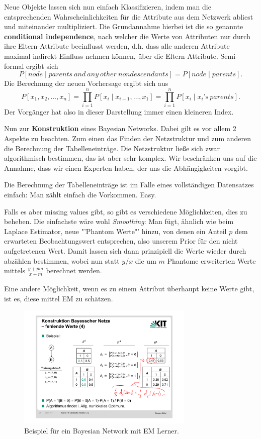 Neue Objekte lassen sich nun einfach Klassifizieren, indem man die
entsprechenden Wahrscheinlichkeiten für die Attribute aus dem Netzwerk
abliest und miteinander multipliziert. Die Grundannahme hierbei ist 
die so genannte \textbf{conditional independence}, nach welcher die
Werte von Attributen nur durch ihre Eltern-Attribute beeinflusst werden,
d.h. dass alle anderen Attribute maximal indirekt Einfluss nehmen können,
über die Eltern-Attribute. Semi-formal ergibt sich
\[
P[node \mid parents\ and\ any\ other\ nondescendants] = P[node \mid parents].
\]
Die Berechnung der neuen Vorhersage ergibt sich aus
\[
P[x_1,x_2,\dots,x_n] = \prod_{i=1}^n P[x_i \mid x_{i-1},\dots,x_1]
= \prod_{i=1}^n P[x_i \mid x_i\text{'s}\ parents].
\]
Der Vorgänger hat also in dieser Darstellung immer einen kleineren Index.


Nun zur \textbf{Konstruktion} eines Bayesian Networks. Dabei gilt 
es vor allem 2 Aspekte zu beachten. Zum einen das Finden der
Netzstruktur und zum anderen die Berechnung der Tabelleneinträge.
Die Netzstruktur ließe sich zwar algorithmisch bestimmen, das ist
aber sehr komplex. Wir beschränken uns auf die Annahme, dass wir
einen Experten haben, der uns die Abhängigkeiten vorgibt.

Die Berechnung der Tabelleneinträge ist im Falle eines vollständigen
Datensatzes einfach: Man zählt einfach die Vorkommen. Easy.

Falls es aber missing values gibt, so gibt es verschiedene Möglichkeiten,
dies zu beheben. Die einfachste wäre wohl \textit{Smoothing}: Man
fügt, ähnlich wie beim Laplace Estimator, neue "'Phantom Werte"' hinzu,
von denen ein Anteil \(p\) dem erwarteten Beobachtungswert
entsprechen, also unserem Prior für den nicht aufgetretenen Wert.
Damit lassen sich dann prinzipiell die Werte wieder durch abzählen
bestimmen, wobei nun statt \(y/x\) die um \(m\) Phantome erweiterten
Werte mittels \(\frac{y+pm}{x+m}\) berechnet werden.

Eine andere Möglichkeit, wenn es zu einem Attribut überhaupt keine
Werte gibt, ist es, diese mittel EM zu schätzen.

\begin{figure}[htbp]
	\centering
	\includegraphics[width=0.75\textwidth]{Figures/BNEM}
	\caption[BN EM Beispiel]{Beispiel für ein Bayesian Network mit EM Lerner.\footnotemark}
	\label{fig:bnem}
\end{figure}


